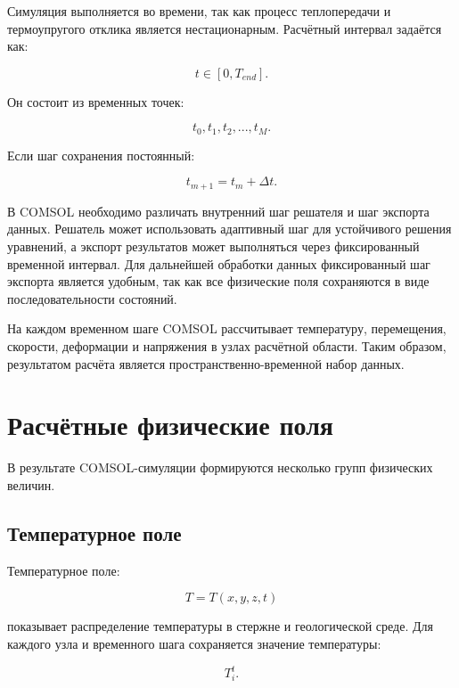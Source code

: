 Симуляция выполняется во времени, так как процесс теплопередачи и термоупругого отклика является нестационарным. Расчётный интервал задаётся как:

\begin{equation}
t\in[0,T_{end}].
\end{equation}

Он состоит из временных точек:

\begin{equation}
t_0,t_1,t_2,...,t_M.
\end{equation}

Если шаг сохранения постоянный:

\begin{equation}
t_{m+1}=t_m+\Delta t.
\end{equation}

В COMSOL необходимо различать внутренний шаг решателя и шаг экспорта данных. Решатель может использовать адаптивный шаг для устойчивого решения уравнений, а экспорт результатов может выполняться через фиксированный временной интервал. Для дальнейшей обработки данных фиксированный шаг экспорта является удобным, так как все физические поля сохраняются в виде последовательности состояний.

На каждом временном шаге COMSOL рассчитывает температуру, перемещения, скорости, деформации и напряжения в узлах расчётной области. Таким образом, результатом расчёта является пространственно-временной набор данных.

\section{Расчётные физические поля}

В результате COMSOL-симуляции формируются несколько групп физических величин.

\subsection{Температурное поле}

Температурное поле:

\begin{equation}
T=T(x,y,z,t)
\end{equation}

показывает распределение температуры в стержне и геологической среде. Для каждого узла и временного шага сохраняется значение температуры:

\begin{equation}
T_i^t.
\end{equation}

